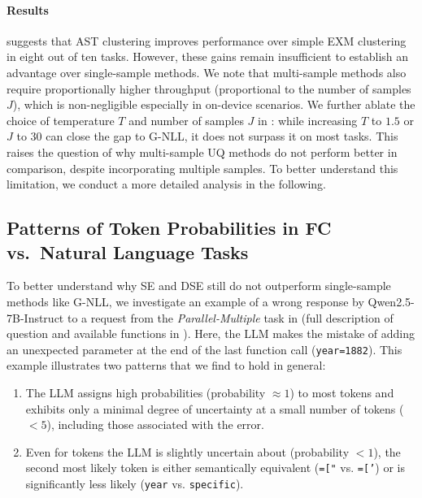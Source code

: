 % 

\paragraph{Results}
 suggests that AST clustering improves performance over simple EXM clustering in eight out of ten tasks. However, these gains remain insufficient to establish an advantage over single-sample methods.
We note that multi-sample methods also require proportionally higher throughput (proportional to the number of samples $J$), which is non-negligible especially in on-device scenarios.
We further ablate the choice of temperature $T$ and number of samples $J$ in : while increasing $T$ to $1.5$ or $J$ to $30$ can close the gap to G-NLL, it does not surpass it on most tasks.
This raises the question of why multi-sample UQ methods do not perform better in comparison, despite incorporating multiple samples. To better understand this limitation, we conduct a more detailed analysis in the following.

\begin{table}[!htbp]

\label{tab:new_method_se}
\end{table}


\subsection{Patterns of Token Probabilities in FC vs.\ Natural Language Tasks}
\label{sec:discussion_se}




To better understand why SE and DSE still do not outperform single-sample methods like G-NLL, we investigate an example of a wrong response by Qwen2.5-7B-Instruct to a request from the \emph{Parallel-Multiple} task in  
(full description of question and available functions in ). 
Here, the LLM makes the mistake of adding an unexpected parameter at the end of the last function call (\texttt{year=1882}). 
This example illustrates two patterns that we find to hold in general:
\begin{enumerate}[leftmargin=*, topsep=0pt, itemsep=2pt, partopsep=0pt, parsep=0pt]
\item The LLM assigns high probabilities (probability $\approx 1$) to most tokens and exhibits only a minimal degree of uncertainty at a small number of tokens ($<5$), including those associated with the error.
\item Even for tokens the LLM is slightly uncertain about (probability $<1$), the second most likely token is either semantically equivalent (\texttt{=["} vs. \texttt{=['}) or is significantly less likely (\texttt{year} vs. \texttt{specific}).
\end{enumerate}



